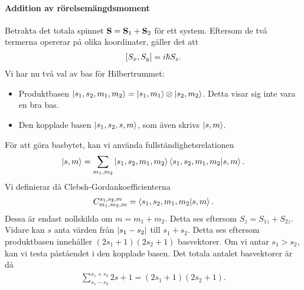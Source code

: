 \paragraph{Addition av rörelsemängdsmoment}
Betrakta det totala spinnet $\vb{S} = \vb{S}_{1} + \vb{S}_{2}$ för ett system. Eftersom de två termerna opererar på olika koordinater, gäller det att
\begin{align*}
	[S_{x}, S_{y}] = i\hbar S_{z}.
\end{align*}
Vi har nu två val av bas för Hilbertrummet:
\begin{itemize}
	\item Produktbasen $\ket{s_{1}, s_{2}, m_{1}, m_{2}} = \ket{s_{1},m_{1}}\otimes\ket{s_{2}, m_{2}}$. Detta visar sig inte vara en bra bas.
	\item Den kopplade basen $\ket{s_{1}, s_{2}, s, m}$, som även skrivs $\ket{s, m}$.
\end{itemize}
För att göra basbytet, kan vi använda fullständighetsrelationen
\begin{align*}
	\ket{s, m} = \sum\limits_{m_{1}, m_{2}}\ket{s_{1}, s_{2}, m_{1}, m_{2}}\braket{s_{1}, s_{2}, m_{1}, m_{2}}{s, m}.
\end{align*}
Vi definierar då Clebsh-Gordankoefficienterna
\begin{align*}
	C_{m_{1}, m_{2}, m}^{s_{1}, s_{2}, m} = \braket{s_{1}, s_{2}, m_{1}, m_{2}}{s, m}.
\end{align*}
Dessa är endast nollskilda om $m = m_{1} + m_{2}$. Detta ses eftersom $S_{z} = S_{1z} + S_{2z}$. Vidare kan $s$ anta värden från $\abs{s_{1} - s_{2}}$ till $s_{1} + s_{2}$. Detta ses eftersom produktbasen innehåller $(2s_{1} + 1)(2s_{2} + 1)$ basvektorer. Om vi antar $s_{1} > s_{2}$, kan vi testa påståendet i den kopplade basen. Det totala antalet basvektorer är då
\begin{align*}
	\sum\limits_{s_{1} - s_{2}}^{s_{1} + s_{2}}2s + 1 = (2s_{1} + 1)(2s_{2} + 1).
\end{align*}